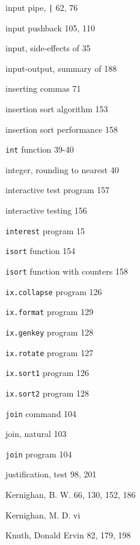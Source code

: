 \begin{multicols}{3}
\hangindent=3pc  input pipe, \verb'|' 62, 76

\hangindent=3pc  input pushback 105, 110

\hangindent=3pc  input, side-effects of 35

\hangindent=3pc  input-output, summary of 188

\hangindent=3pc  inserting commas 71

\hangindent=3pc  insertion sort algorithm 153

\hangindent=3pc  insertion sort performance 158

\hangindent=3pc  \verb'int' function 39-40

\hangindent=3pc  integer, rounding to nearest 40

\hangindent=3pc  interactive test program 157

\hangindent=3pc  interactive testing 156

\hangindent=3pc  \verb'interest' program 15 

\hangindent=3pc  \verb'isort' function 154

\hangindent=3pc  \verb'isort' function with counters 158

\hangindent=3pc  \verb'ix.collapse' program 126

\hangindent=3pc  \verb'ix.format' program 129 

\hangindent=3pc  \verb'ix.genkey' program 128 

\hangindent=3pc  \verb'ix.rotate' program 127 

\hangindent=3pc  \verb'ix.sort1' program 126

\hangindent=3pc  \verb'ix.sort2' program 128 

\hangindent=3pc  \verb'join' command 104

\hangindent=3pc  join, natural 103

\hangindent=3pc  \verb'join' program 104

\hangindent=3pc  justification, test 98, 201

\hangindent=3pc  Kernighan, B. W. 66, 130, 152, 186

\hangindent=3pc  Kernighan, M. D. vi 

\hangindent=3pc  Knuth, Donald Ervin 82, 179, 198


\end{multicols}
